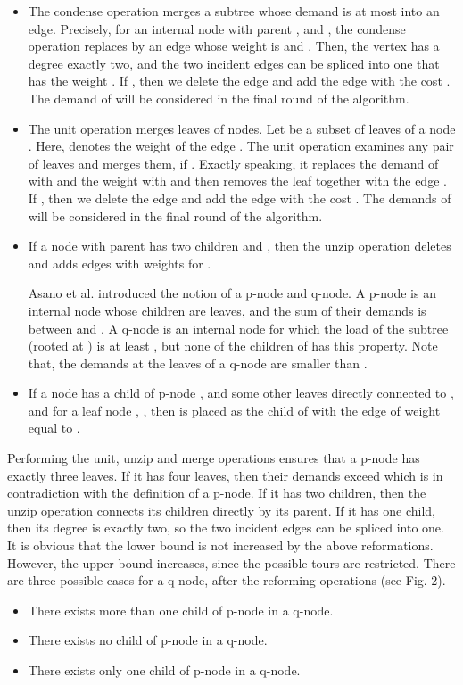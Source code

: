 \begin{itemize} 
\item[]  The condense operation merges a subtree whose demand is at most  into an edge. Precisely, for an internal node  with parent  , and , the condense operation replaces  by an edge  whose weight is  and . Then, the vertex  has a degree exactly two, and the two incident edges can be spliced into one that has the weight . If , then we delete the edge  and add the edge  with the cost . The demand of  will be considered in the final round of the algorithm. 
\item[]  The unit operation merges leaves of nodes. Let  be a subset of leaves of a node . Here,  denotes the weight of the edge . The unit operation examines any pair of leaves  and merges them, if . Exactly speaking, it replaces the demand of  with  and the weight  with  and then removes the leaf  together with the edge . If , then we delete the edge  and add the edge  with the cost . The demands of  will be considered in the final round of the algorithm. 
\item[]  If a node  with parent   has two children  and , then the unzip operation deletes  and adds edges  with weights  for .

\indent Asano et al. \cite{Asano2001} introduced the notion of a p-node and q-node. A p-node is an internal node whose children are leaves, and the sum of their demands is between  and . A q-node  is an internal node for which the load of the subtree  (rooted at ) is at least , but none of the children of  has this property. Note that, the demands at the leaves of a q-node are smaller than .
\item[]  If a node  has a child of p-node , and some other leaves directly connected to , and for a leaf node , , then  is placed as the child of  with the edge of weight equal to . 
\end{itemize}

\indent  Performing the unit, unzip and merge operations ensures that a p-node has exactly three leaves. If it has four leaves, then their demands exceed  which is in contradiction with the definition of a p-node. If it has two children, then the unzip operation connects its children directly by its parent. If it has one child, then its degree is exactly two, so the two incident edges can be spliced into one. It is obvious that the lower bound is not increased by the above reformations. However, the upper bound increases, since the possible tours are restricted. There are three possible cases for a q-node, after the reforming operations (see Fig. 2). 
\begin{itemize}
\item[]  There exists more than one child of p-node in a q-node.
\item[]  There exists no child of p-node in a q-node.
\item[]  There exists only one child of p-node in a q-node.\\
\end{itemize}
 
